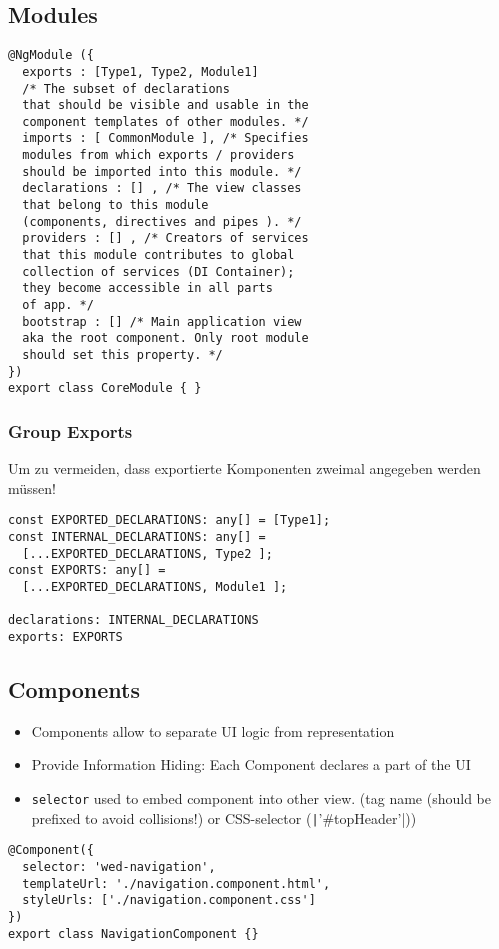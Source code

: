 \begin{multicols*}{4}
\subsection{Modules}
\begin{verbatim}
@NgModule ({
  exports : [Type1, Type2, Module1]
  /* The subset of declarations
  that should be visible and usable in the
  component templates of other modules. */
  imports : [ CommonModule ], /* Specifies
  modules from which exports / providers
  should be imported into this module. */
  declarations : [] , /* The view classes
  that belong to this module
  (components, directives and pipes ). */
  providers : [] , /* Creators of services
  that this module contributes to global
  collection of services (DI Container);
  they become accessible in all parts
  of app. */
  bootstrap : [] /* Main application view
  aka the root component. Only root module
  should set this property. */
})
export class CoreModule { }
\end{verbatim}

\subsubsection{Group Exports}
Um zu vermeiden, dass exportierte Komponenten zweimal angegeben werden müssen!
\begin{verbatim}
const EXPORTED_DECLARATIONS: any[] = [Type1];
const INTERNAL_DECLARATIONS: any[] =
  [...EXPORTED_DECLARATIONS, Type2 ];
const EXPORTS: any[] =
  [...EXPORTED_DECLARATIONS, Module1 ];

declarations: INTERNAL_DECLARATIONS
exports: EXPORTS
\end{verbatim}

\subsection{Components}
\begin{itemize}
    \item Components allow to separate UI logic from representation
    \item Provide Information Hiding: Each Component declares a part of the UI
    \item \lstinline|selector| used to embed component into other view. (tag name (should be prefixed to avoid collisions!) or CSS-selector (\texttt|'#topHeader'|))
\end{itemize}

\begin{verbatim}
@Component({
  selector: 'wed-navigation',
  templateUrl: './navigation.component.html',
  styleUrls: ['./navigation.component.css']
})
export class NavigationComponent {}
\end{verbatim}


\end{multicols*}
